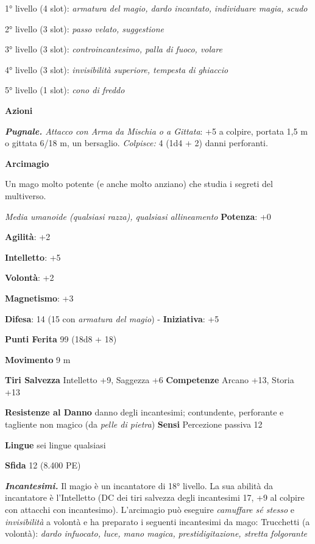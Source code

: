 \begin{multicols}{2}
1° livello (4 slot): \emph{armatura del magio, dardo incantato,}
\emph{individuare magia, scudo}

2° livello (3 slot): \emph{passo velato, suggestione}

3° livello (3 slot): \emph{controincantesimo, palla di fuoco, volare}

4° livello (3 slot): \emph{invisibilità superiore, tempesta di ghiaccio}

5° livello (1 slot): \emph{cono di freddo}

\textbf{Azioni}

\emph{\textbf{Pugnale.} Attacco con Arma da Mischia o a Gittata}: +5 a
colpire, portata 1,5 m o gittata 6/18 m, un bersaglio. \emph{Colpisce:}
4 (1d4 + 2) danni perforanti.




\textbf{Arcimagio}

Un mago molto potente (e anche molto anziano) che studia i segreti del
multiverso.

\emph{Media umanoide (qualsiasi razza), qualsiasi allineamento}
\textbf{Potenza}: +0

\textbf{Agilità}: +2

\textbf{Intelletto}: +5

\textbf{Volontà}: +2

\textbf{Magnetismo}: +3

\textbf{Difesa}: 14 (15 con \emph{armatura del magio}) - \textbf{Iniziativa}: +5

\textbf{Punti Ferita} 99 (18d8 + 18)

\textbf{Movimento} 9 m

\textbf{Tiri Salvezza} Intelletto +9, Saggezza +6 \textbf{Competenze}
Arcano +13, Storia +13

\textbf{Resistenze al Danno} danno degli incantesimi; contundente,
perforante e tagliente non magico (da \emph{pelle di pietra})
\textbf{Sensi} Percezione passiva 12

\textbf{Lingue} sei lingue qualsiasi

\textbf{Sfida} 12 (8.400 PE)

\emph{\textbf{Incantesimi.}} Il magio è un incantatore di 18° livello.
La sua abilità da incantatore è l'Intelletto (DC dei tiri salvezza
degli incantesimi 17, +9 al colpire con attacchi con incantesimo).
L'arcimagio può eseguire \emph{camuffare sé stesso} e
\emph{invisibilità} a volontà e ha preparato i seguenti incantesimi da
mago: Trucchetti (a volontà): \emph{dardo infuocato, luce, mano magica,}
\emph{prestidigitazione, stretta folgorante}


\end{multicols}
